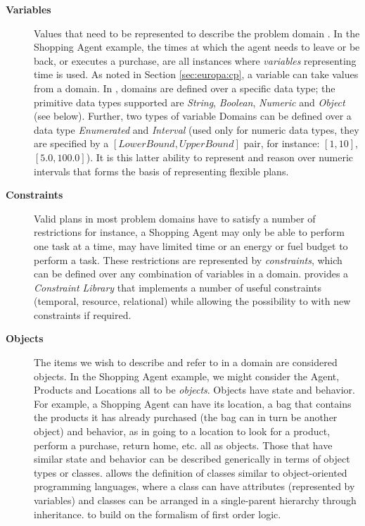\begin{description}

\item[\textbf{Variables}] Values that need to be represented to
  describe the problem domain .  In the Shopping Agent example, the times at which the
  agent needs to leave or be back, or executes a purchase, are all
  instances where \emph{variables} representing time is used.  As
  noted in Section \ref{sec:europa:cp}, a variable can take values
  from a domain. In \eu, domains are defined over a specific data
  type; the primitive data types supported are \textit{String},
  \textit{Boolean}, \textit{Numeric} and \textit{Object} (see
  below). Further, two types of variable Domains can be defined over a
  data type \textit{Enumerated} and \textit{Interval} (used only for
  numeric data types, they are specified by a
  $[LowerBound,UpperBound]$ pair, for instance: $[1,10]$,
  $[5.0,100.0]$). It is this latter ability to represent and reason
  over numeric intervals that forms the basis of representing flexible
  plans.

\item[\textbf{Constraints}] Valid plans in most problem domains have
  to satisfy a number of restrictions for instance, a Shopping Agent
  may only be able to perform one task at a time, may have limited
  time or an energy or fuel budget to perform a task. These
  restrictions are represented by \emph{constraints}, which can be
  defined over any combination of variables in a domain. \eu provides
  a \emph{Constraint Library} that implements a number of useful
  constraints (temporal, resource, relational) while allowing the
  possibility to  with new constraints if required.

\item[\textbf{Objects}] The items we wish to describe and refer to in
  a domain are considered objects.  In the Shopping Agent example, we
  might consider the Agent, Products and Locations all to be
  \emph{objects}. Objects have state and behavior.  For example, a
  Shopping Agent can have its location, a bag that contains the
  products it has already purchased (the bag can in turn be another
  object) and behavior, as in going to a location to look for a
  product, perform a purchase, return home, etc. all as objects.
  Those that have similar state and behavior can be described
  generically in terms of object types or classes. \eu allows the
  definition of classes similar to object-oriented programming
  languages, where a class can have attributes (represented by
  variables) and classes can be arranged in a single-parent hierarchy
  through inheritance.   to build on
  the formalism of first order logic.


\end{description}
